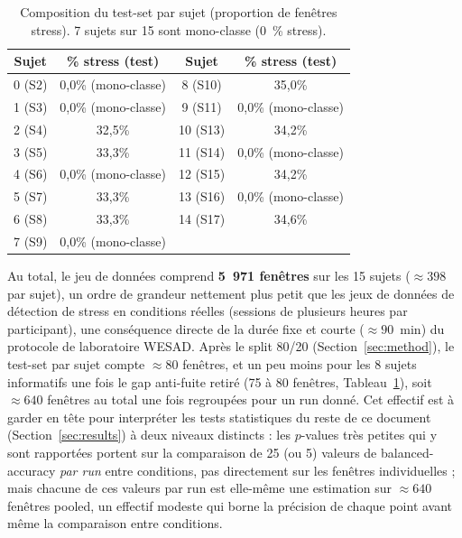 \documentclass{acmart}
\begin{document}
\begin{table}[h!]
  \centering
  \small
  \caption{Composition du test-set par sujet (proportion de fenêtres
  stress). 7 sujets sur 15 sont mono-classe (0~\% stress).}
  \label{tab:class_composition}
  \begin{tabular}{cccc}
    \toprule
    Sujet & \% stress (test) & Sujet & \% stress (test) \\
    \midrule
    0 (S2)  & 0,0\% (mono-classe)  & 8 (S10)  & 35,0\% \\
    1 (S3)  & 0,0\% (mono-classe)  & 9 (S11)  & 0,0\% (mono-classe) \\
    2 (S4)  & 32,5\%               & 10 (S13) & 34,2\% \\
    3 (S5)  & 33,3\%               & 11 (S14) & 0,0\% (mono-classe) \\
    4 (S6)  & 0,0\% (mono-classe)  & 12 (S15) & 34,2\% \\
    5 (S7)  & 33,3\%               & 13 (S16) & 0,0\% (mono-classe) \\
    6 (S8)  & 33,3\%               & 14 (S17) & 34,6\% \\
    7 (S9)  & 0,0\% (mono-classe)  & &  \\
    \bottomrule
  \end{tabular}
\end{table}

Au total, le jeu de données comprend \textbf{5~971 fenêtres} sur les 15
sujets ($\approx 398$ par sujet), un ordre de grandeur nettement plus petit
que les jeux de données de détection de stress en conditions réelles
(sessions de plusieurs heures par participant), une conséquence directe de
la durée fixe et courte ($\approx 90$~min) du protocole de laboratoire WESAD.
Après le split 80/20 (Section~\ref{sec:method}), le test-set par sujet
compte $\approx 80$ fenêtres, et un peu moins pour les 8 sujets informatifs
une fois le gap anti-fuite retiré (75 à 80 fenêtres, Tableau~\ref{tab:class_composition}),
soit $\approx 640$ fenêtres au total une fois regroupées pour un run donné.
Cet effectif est à garder en tête pour interpréter les tests statistiques
du reste de ce document (Section~\ref{sec:results}) à deux niveaux
distincts : les $p$-values très petites qui y sont rapportées portent sur
la comparaison de 25 (ou 5) valeurs de balanced-accuracy \emph{par run}
entre conditions, pas directement sur les fenêtres individuelles ; mais
chacune de ces valeurs par run est elle-même une estimation sur
$\approx 640$ fenêtres pooled, un effectif modeste qui borne la précision de
chaque point avant même la comparaison entre conditions.
\end{document}
